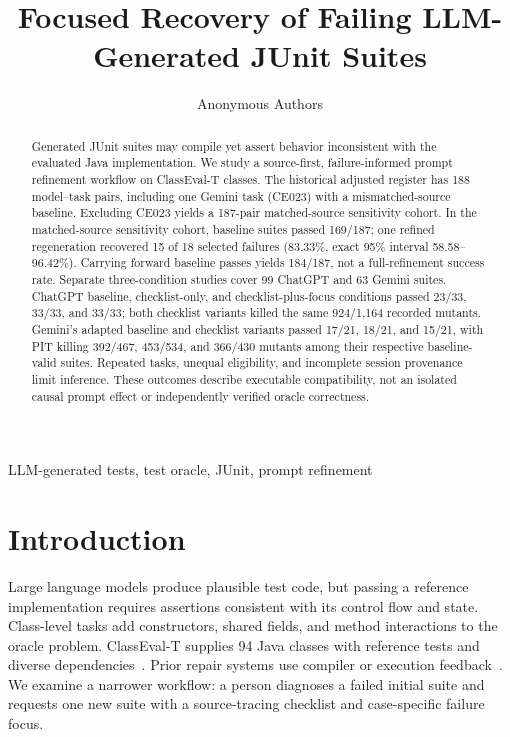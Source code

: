 \documentclass[conference]{IEEEtran}
\begin{document}
\title{Focused Recovery of Failing LLM-Generated JUnit Suites}
\author{Anonymous Authors}
\maketitle

\begin{abstract}
Generated JUnit suites may compile yet assert behavior inconsistent with the evaluated Java implementation. We study a source-first, failure-informed prompt refinement workflow on ClassEval-T classes. The historical adjusted register has 188 model--task pairs, including one Gemini task (CE023) with a mismatched-source baseline. Excluding CE023 yields a 187-pair matched-source sensitivity cohort. In the matched-source sensitivity cohort, baseline suites passed 169/187; one refined regeneration recovered 15 of 18 selected failures (83.33\%, exact 95\% interval 58.58--96.42\%). Carrying forward baseline passes yields 184/187, not a full-refinement success rate. Separate three-condition studies cover 99 ChatGPT and 63 Gemini suites. ChatGPT baseline, checklist-only, and checklist-plus-focus conditions passed 23/33, 33/33, and 33/33; both checklist variants killed the same 924/1,164 recorded mutants. Gemini's adapted baseline and checklist variants passed 17/21, 18/21, and 15/21, with PIT killing 392/467, 453/534, and 366/430 mutants among their respective baseline-valid suites. Repeated tasks, unequal eligibility, and incomplete session provenance limit inference. These outcomes describe executable compatibility, not an isolated causal prompt effect or independently verified oracle correctness.
\end{abstract}
\begin{IEEEkeywords}
LLM-generated tests, test oracle, JUnit, prompt refinement
\end{IEEEkeywords}

\section{Introduction}
Large language models produce plausible test code, but passing a reference implementation requires assertions consistent with its control flow and state. Class-level tasks add constructors, shared fields, and method interactions to the oracle problem. ClassEval-T supplies 94 Java classes with reference tests and diverse dependencies~\cite{classevalt}. Prior repair systems use compiler or execution feedback~\cite{chattester,testart}. We examine a narrower workflow: a person diagnoses a failed initial suite and requests one new suite with a source-tracing checklist and case-specific failure focus.
\end{document}
